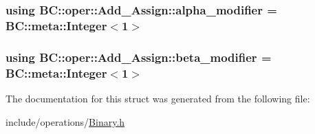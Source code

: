 \subsubsection[{\texorpdfstring{alpha\+\_\+modifier}{alpha_modifier}}]{\setlength{\rightskip}{0pt plus 5cm}using {\bf B\+C\+::oper\+::\+Add\+\_\+\+Assign\+::alpha\+\_\+modifier} =  {\bf B\+C\+::meta\+::\+Integer}$<$1$>$}\hypertarget{structBC_1_1oper_1_1Add__Assign_a20b991b7d4a8c7e4eb82d8953130001a}{}\label{structBC_1_1oper_1_1Add__Assign_a20b991b7d4a8c7e4eb82d8953130001a}
\subsubsection[{\texorpdfstring{beta\+\_\+modifier}{beta_modifier}}]{\setlength{\rightskip}{0pt plus 5cm}using {\bf B\+C\+::oper\+::\+Add\+\_\+\+Assign\+::beta\+\_\+modifier} =  {\bf B\+C\+::meta\+::\+Integer}$<$1$>$}\hypertarget{structBC_1_1oper_1_1Add__Assign_aa9d7a564657d1254a78611b2b06d8744}{}\label{structBC_1_1oper_1_1Add__Assign_aa9d7a564657d1254a78611b2b06d8744}


The documentation for this struct was generated from the following file\+:\begin{DoxyCompactItemize}
\item 
include/operations/\hyperlink{Binary_8h}{Binary.\+h}\end{DoxyCompactItemize}
